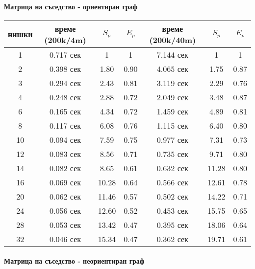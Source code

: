 \paragraph*{Матрица на съседство - ориентиран граф}

\begin{center}
\begin{tabular}{ | c | c c c | c c c | }
  нишки & време (200k/4m) & $S_p$ & $E_p$ & време (200k/40m) & $S_p$ & $E_p$ \\
  \hline
  1  & 0.717 сек & 1 & 1 & 7.144 сек & 1 & 1 \\
  2  & 0.398 сек & 1.80 & 0.90 & 4.065 сек & 1.75 & 0.87 \\
  3  & 0.294 сек & 2.43 & 0.81 & 3.119 сек & 2.29 & 0.76 \\
  4  & 0.248 сек & 2.88 & 0.72 & 2.049 сек & 3.48 & 0.87 \\
  6  & 0.165 сек & 4.34 & 0.72 & 1.459 сек & 4.89 & 0.81 \\
  8  & 0.117 сек & 6.08 & 0.76 & 1.115 сек & 6.40 & 0.80 \\
  10 & 0.094 сек & 7.59 & 0.75 & 0.977 сек & 7.31 & 0.73 \\
  12 & 0.083 сек & 8.56 & 0.71 & 0.735 сек & 9.71 & 0.80 \\
  14 & 0.082 сек & 8.65 & 0.61 & 0.632 сек & 11.28 & 0.80 \\
  16 & 0.069 сек & 10.28 & 0.64 & 0.566 сек & 12.61 & 0.78 \\
  20 & 0.062 сек & 11.46 & 0.57 & 0.502 сек & 14.22 & 0.71 \\
  24 & 0.056 сек & 12.60 & 0.52 & 0.453 сек & 15.75 & 0.65 \\
  28 & 0.053 сек & 13.42 & 0.47 & 0.395 сек & 18.06 & 0.64 \\
  32 & 0.046 сек & 15.34 & 0.47 & 0.362 сек & 19.71 & 0.61 \\
\end{tabular}
\end{center}

\paragraph*{Матрица на съседство - неориентиран граф}


